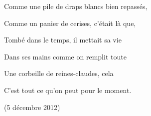 {Comme une pile de draps blancs bien repassés,

Comme un panier de cerises, c'était là que,

Tombé dans le temps, il mettait sa vie

Dans ses mains comme on remplit toute

Une corbeille de reines-claudes, cela

C'est tout ce qu'on peut pour le moment.

\begin{flushright}
(5 décembre 2012)\hspace*{3cm}
\end{flushright}

\setlength{\parskip}{6pt}
}


